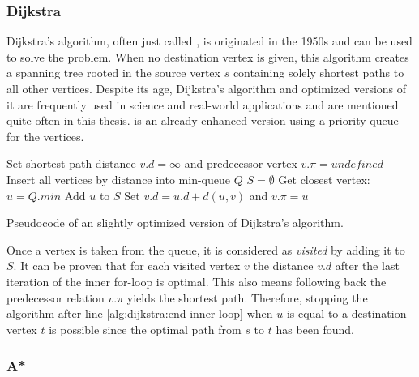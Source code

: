 		\subsubsection{Dijkstra}
		\label{subsubsec:dijkstra}
		
			Dijkstra's algorithm, often just called , is originated in the 1950s and can be used to solve the  problem.
			When no destination vertex is given, this algorithm creates a spanning tree rooted in the source vertex $s$ containing solely shortest paths to all other vertices.
			Despite its age, Dijkstra's algorithm and optimized versions of it are frequently used in science and real-world applications and are mentioned quite often in this thesis.
			 is an already enhanced version using a priority queue for the vertices\cite[658]{cormen-introduction-to-alg}.
			
			\begin{algorithm}[h]
				\begin{algorithmic}[1]
						\State Set shortest path distance $v.d = \infty$ and predecessor vertex $v.\pi = undefined$
					\EndFor
					\State Insert all vertices by distance into min-queue $Q$
					\State $S = \emptyset$
						\State Get closest vertex: $u = Q.min$
							\State Add $u$ to $S$
								\State Set $v.d = u.d + d(u, v)$ and $v.\pi = u$
							\EndIf
						\EndFor \label{alg:dijkstra:end-inner-loop}
					\EndWhile
				\end{algorithmic}
				\caption{Pseudocode of an slightly optimized version of Dijkstra's algorithm.}
				\label{alg:dijkstra}
			\end{algorithm}
			\noindent
			Once a vertex is taken from the queue, it is considered as \emph{visited} by adding it to $S$.
			It can be proven that for each visited vertex $v$ the distance $v.d$ after the last iteration of the inner for-loop is optimal\cite[659-661]{cormen-introduction-to-alg}.
			This also means following back the predecessor relation $v.\pi$ yields the shortest path.
			Therefore, stopping the algorithm after line \ref{alg:dijkstra:end-inner-loop} when $u$ is equal to a destination vertex $t$ is possible since the optimal path from $s$ to $t$ has been found.
		
		\subsubsection{A*}
		\label{subsubsec:astar}
		
